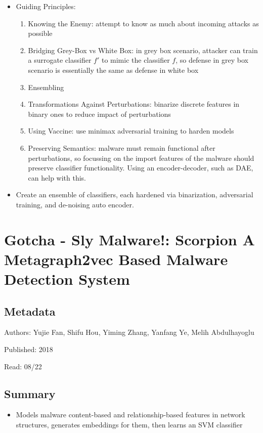 \documentclass{article}
\begin{document}
\begin{itemize}
\item Guiding Principles:
	\begin{enumerate}
	\item Knowing the Enemy: attempt to know as much about incoming attacks as possible
	\item Bridging Grey-Box vs White Box: in grey box scenario, attacker can train a surrogate classifier $f'$ to mimic the classifier $f$, so defense in grey box scenario is essentially the same as defense in white box
	\item Ensembling
	\item Transformations Against Perturbations: binarize discrete features in binary ones to reduce impact of perturbations
	\item Using Vaccine: use minimax adversarial training to harden models
	\item Preserving Semantics: malware must remain functional after perturbations, so focussing on the import features of the malware should preserve classifier functionality. Using an encoder-decoder, such as DAE, can help with this.
	\end{enumerate}
\item Create an ensemble of classifiers, each hardened via binarization, adversarial training, and de-noising auto encoder.
\end{itemize}
\pagebreak


\section*{Gotcha - Sly Malware!: Scorpion A Metagraph2vec Based Malware Detection System}

\subsection*{Metadata}

\noindent Authors: Yujie Fan, Shifu Hou, Yiming Zhang, Yanfang Ye, Melih Abdulhayoglu

\noindent Published: 2018

\noindent Read: 08/22

\subsection*{Summary}
\begin{itemize}
	\item Models malware content-based and relationship-based features in network structures, generates embeddings for them, then learns an SVM classifier
\end{itemize}
\end{document}
